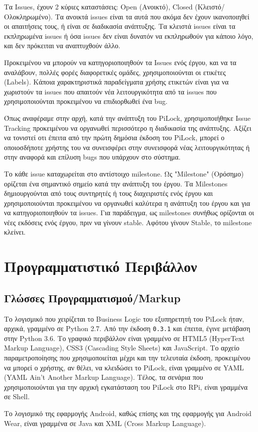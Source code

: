 		Τα Issues, έχουν 2 κύριες καταστάσεις: Open (Ανοικτό), Closed (Κλειστό/Ολοκληρωμένο). Τα ανοικτά issues είναι τα αυτά που ακόμα δεν έχουν ικανοποιηθεί οι απαιτήσεις τους, ή είναι σε διαδικασία ανάπτυξης. Τα κλειστά issues είναι τα εκπληρωμένα issues ή όσα issues δεν είναι δυνατόν να εκπληρωθούν για κάποιο λόγο, και δεν πρόκειται να αναπτυχθούν άλλο.

		Προκειμένου να μπορούν να κατηγοριοποιηθούν τα Issues ενός έργου, και να τα αναλάβουν, πολλές φορές διαφορετικές ομάδες, χρησιμοποιούνται οι ετικέτες (Labels). Κάποια χαρακτηριστικά παραδείγματα χρήσης ετικετών είναι για να χωριστούν τα issues που απαιτούν νέα λειτουργικότητα από τα issues που χρησιμοποιούνται προκειμένου να επιδιορθωθεί ένα bug.

		Όπως αναφέραμε στην αρχή, κατά την ανάπτυξη του PiLock, χρησιμοποιήθηκε Issue Tracking προκειμένου να οργανωθεί περισσότερο η διαδικασία της ανάπτυξης. Αξίζει να τονιστεί οτι έπειτα από την πρώτη δημόσια έκδοση του PiLock, μπορεί ο οποιοσδήποτε χρήστης του να συνεισφέρει στην συνεισφορά νέας λειτουργικότητας ή στην αναφορά και επίλυση bugs που υπάρχουν στο σύστημα.

		Το κάθε issue καταχωρείται στο αντίστοιχο milestone. Ως "Milestone" (Ορόσημο) ορίζεται ένα σημαντικό σημείο κατά την ανάπτυξη του έργου. Τα Milestones δημιουργούνται από τους συντηρητές ή τους διαχειριστές ενός έργου και χρησιμοποιούνται προκειμένου να οργανωθεί καλύτερα η ανάπτυξη του έργου και για να κατηγοριοποιηθούν τα issues. Για παράδειγμα, ως milestones συνήθως ορίζονται οι νέες εκδόσεις ενός έργου, πριν να γίνουν stable. Αφότου γίνουν Stable, το milestone κλείνει.

\section{Προγραμματιστικό Περιβάλλον}
	\subsection{Γλώσσες Προγραμματισμού/Markup}
		Το λογισμικό που χειρίζεται το Business Logic του εξυπηρετητή του PiLock ήταν, αρχικά, γραμμένο σε Python 2.7. Από την έκδοση \verb|0.3.1| και έπειτα, έγινε μετάβαση στην Python 3.6. Το γραφικό περιβάλλον είναι γραμμένο σε HTML5 (HyperText Markup Language), CSS3 (Cascading Style Sheets) και JavaScript. Το αρχείο παραμετροποίησης που χρησιμοποιείται μέχρι και την τελευταία έκδοση, προκειμένου να μπορεί ο χρήστης, αν θέλει, να κλειδώσει το PiLock, είναι γραμμένο σε YAML (YAML Ain't Another Markup Language). Τέλος, τα σενάρια που χρησιμοποιούνται για την αρχική εγκατάσταση του PiLock στο RPi, είναι γραμμένα σε Shell.

		Το λογισμικό της εφαρμογής Android, καθώς επίσης και της εφαρμογής για Android Wear, είναι γραμμένα σε Java και XML (Cross Markup Language).


 